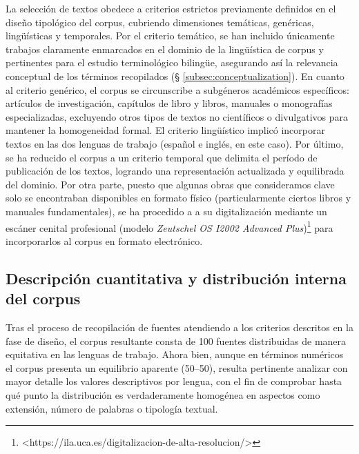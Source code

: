La selección de textos obedece a criterios estrictos previamente definidos en el diseño tipológico del corpus, cubriendo dimensiones temáticas, genéricas, lingüísticas y temporales. Por el criterio temático, se han incluido únicamente trabajos claramente enmarcados en el dominio de la lingüística de corpus y pertinentes para el estudio terminológico bilingüe, asegurando así la relevancia conceptual de los términos recopilados (§ \ref{subsec:conceptualization}). En cuanto al criterio genérico, el corpus se circunscribe a subgéneros académicos específicos: artículos de investigación, capítulos de libro y libros, manuales o monografías especializadas, excluyendo otros tipos de textos no científicos o divulgativos para mantener la homogeneidad formal. El criterio lingüístico implicó incorporar textos en las dos lenguas de trabajo (español e inglés, en este caso). Por último, se ha reducido el corpus a un criterio temporal que delimita el período de publicación de los textos, logrando una representación actualizada y equilibrada del dominio. Por otra parte, puesto que algunas obras que consideramos clave solo se encontraban disponibles en formato físico (particularmente ciertos libros y manuales fundamentales), se ha procedido a a su digitalización mediante un escáner cenital profesional (modelo \textit{Zeutschel OS I2002 Advanced Plus})\footnote{<https://ila.uca.es/digitalizacion-de-alta-resolucion/>} para incorporarlos al corpus en formato electrónico.

\subsection{Descripción cuantitativa y distribución interna del corpus} \label{descripcion}
Tras el proceso de recopilación de fuentes atendiendo a los criterios descritos en la fase de diseño, el corpus resultante consta de 100 fuentes distribuidas de manera equitativa en las lenguas de trabajo. Ahora bien, aunque en términos numéricos el corpus presenta un equilibrio aparente (50–50), resulta pertinente analizar con mayor detalle los valores descriptivos por lengua, con el fin de comprobar hasta qué punto la distribución es verdaderamente homogénea en aspectos como extensión, número de palabras o tipología textual.

